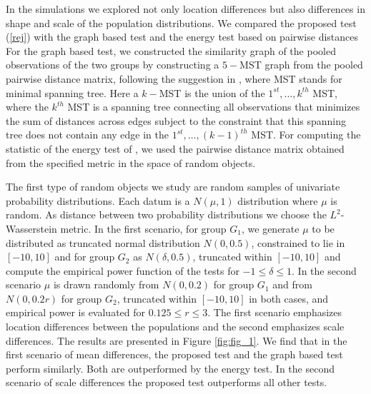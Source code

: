 \documentclass[lineno]{biometrika}
\def\ci{\cite}
\def\ci{\cite}
\begin{document}
    In the simulations we explored not only location differences but also differences in shape and scale of the population distributions. We compared the proposed  test (\ref{rej})  with the graph based test \citep{chen:16} and the energy test based on pairwise distances \citep{szek:04} %
    For the graph based test, we constructed the similarity graph of the pooled observations of the two groups by constructing  a $5-$MST graph from the pooled pairwise distance matrix, following the suggestion in \ci{chen:16}, where MST stands for minimal spanning tree. Here a  $k-$MST is the union of the $1^{st},\dots, k^{th}$ MST, where the $k^{th}$ MST is a spanning tree connecting all observations that minimizes the sum of distances across edges subject to the constraint that this spanning tree does not contain any edge in the $1^{st},\dots , (k-1)^{th}$  MST. For computing the statistic of the energy test of \cite{szek:04}, we used the pairwise distance matrix obtained from the specified metric in the space of random objects. %
    
    
   The first type of random objects we study are random samples of univariate probability distributions. Each datum is a $N(\mu,1)$ distribution where $\mu$ is random. As distance  between two probability distributions we choose the $L^2$-Wasserstein metric. In the first scenario, for group $G_1$, we generate  $\mu$ {to be distributed as truncated normal distribution $N(0,0.5)$, constrained to lie in $[-10,10]$ and for group $G_2$  as $N(\delta,0.5)$, truncated within $[-10,10]$ and compute the empirical power function of the tests for $-1 \leq \delta \leq 1$}. In the second scenario $\mu$ is drawn randomly from $N(0,0.2)$ for group $G_1$ and from $N(0,0.2r)$ for group $G_2$, {truncated within $[-10,10]$ in both cases,} and empirical power is evaluated for $0.125 \leq r \leq 3$. The first  scenario emphasizes  location differences between the populations and the second emphasizes scale differences. The results are presented in Figure \ref{fig:fig_1}. We find that in  the first scenario of mean differences, the proposed test and the graph based test perform similarly. Both are outperformed by the energy test. In the second scenario of scale differences the proposed test outperforms all other tests.  %
  
\end{document}
